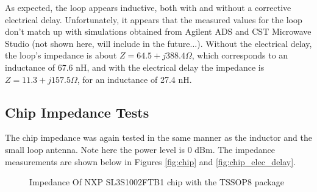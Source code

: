 \documentclass[12pt,onecolumn,titlepage]{article}
\begin{document}
As expected, the loop appears inductive, both with and without a corrective electrical delay. Unfortunately, it appears that the measured values for the loop don't match up with simulations obtained from Agilent ADS and CST Microwave Studio (not shown here, will include in the future...). Without the electrical delay, the loop's impedance is about $Z=64.5+j388.4\Omega$, which corresponds to an inductance of 67.6 nH, and with the electrical delay the impedance is $Z=11.3+j157.5\Omega$, for an inductance of 27.4 nH.

\subsection{Chip Impedance Tests}
\indent \indent The chip impedance was again tested in the same manner as the inductor and the small loop antenna. Note here the power level is 0 dBm. The impedance measurements are shown below in Figures \ref{fig:chip} and \ref{fig:chip_elec_delay}.

\begin{figure}[ht!]
	\centering
	\label{fig:loop_test1}
	\caption{Impedance Of NXP SL3S1002FTB1 chip with the TSSOP8 package}
\end{figure}
\end{document}
